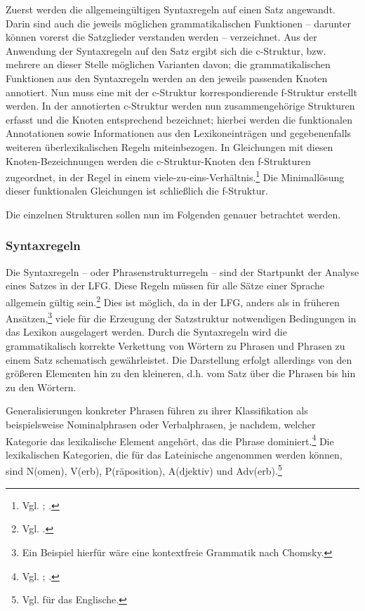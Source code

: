 \documentclass[12pt,a4paper]{article}
\begin{document}
Zuerst werden die allgemeingültigen Syntaxregeln auf einen Satz angewandt. Darin sind auch die jeweils möglichen grammatikalischen Funktionen -- darunter können vorerst die Satzglieder verstanden werden -- verzeichnet. Aus der Anwendung der Syntaxregeln auf den Satz ergibt sich die c-Struktur, bzw. mehrere an dieser Stelle möglichen Varianten davon; die grammatikalischen Funktionen aus den Syntaxregeln werden an den jeweils passenden Knoten annotiert. Nun muss eine mit der c-Struktur korrespondierende f-Struktur erstellt werden. In der annotierten c-Struktur werden nun zusammengehörige Strukturen erfasst und die Knoten entsprechend bezeichnet; hierbei werden die funktionalen Annotationen sowie Informationen aus den Lexikoneinträgen und gegebenenfalls weiteren überlexikalischen Regeln miteinbezogen. In Gleichungen mit diesen Knoten-Bezeichnungen werden die c-Struktur-Knoten den f-Strukturen zugeordnet, in der Regel in einem viele-zu-eins-Verhältnis.\footnote{Vgl. \cite[64]{Falk}; \cite[9]{Skript}.} Die Minimallösung dieser funktionalen Gleichungen ist schließlich die f-Struktur.

Die einzelnen Strukturen sollen nun im Folgenden genauer betrachtet werden.

\subsubsection{Syntaxregeln}
Die Syntaxregeln -- oder Phrasenstrukturregeln -- sind der Startpunkt der Analyse eines Satzes in der LFG. Diese Regeln müssen für alle Sätze einer Sprache allgemein gültig sein.\footnote{Vgl. \cite[47]{Dal}.} Dies ist möglich, da in der LFG, anders als in früheren Ansätzen,\footnote{Ein Beispiel hierfür wäre eine kontextfreie Grammatik nach Chomsky.} viele für die Erzeugung der Satzstruktur notwendigen Bedingungen in das Lexikon ausgelagert werden. Durch die Syntaxregeln wird die grammatikalisch korrekte Verkettung von Wörtern zu Phrasen und Phrasen zu einem Satz schematisch gewährleistet. Die Darstellung erfolgt allerdings von den größeren Elementen hin zu den kleineren, d.h. vom Satz über die Phrasen bis hin zu den Wörtern.

Generalisierungen konkreter Phrasen führen zu ihrer Klassifikation als beispielsweise Nominalphrasen oder Verbalphrasen, je nachdem, welcher Kategorie das lexikalische Element angehört, das die Phrase dominiert.\footnote{Vgl. \cite[47; 53; 58-9]{Dal}; \cite[15]{Rohrer}.} Die lexikalischen Kategorien, die für das Lateinische angenommen werden können, sind N(omen), V(erb), P(räposition), A(djektiv) und Adv(erb).\footnote{Vgl. \cite[46; 52]{Dal} für das Englische.}
\end{document}
